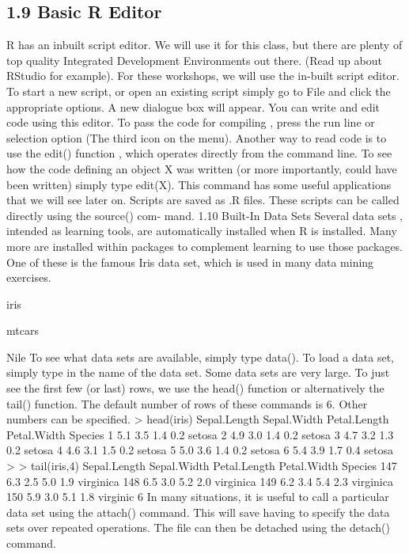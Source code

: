 
\subsection{1.9 Basic R Editor}
R has an inbuilt script editor. We will use it for this class, but there are plenty of top quality
Integrated Development Environments out there. (Read up about RStudio for example).
For these workshops, we will use the in-built script editor.
To start a new script, or open an existing script simply go to File and click the appropriate
options. A new dialogue box will appear. You can write and edit code using this editor.
To pass the code for compiling , press the run line or selection option (The third icon
on the menu).
Another way to read code is to use the edit() function , which operates directly from the
command line. To see how the code defining an object X was written (or more importantly,
could have been written) simply type edit(X). This command has some useful applications
that we will see later on.
Scripts are saved as .R files. These scripts can be called directly using the source() com-
mand.
1.10 Built-In Data Sets
Several data sets , intended as learning tools, are automatically installed when R is installed.
Many more are installed within packages to complement learning to use those packages. One
of these is the famous Iris data set, which is used in many data mining exercises.
\item iris
\item mtcars
\item Nile
To see what data sets are available, simply type data(). To load a data set, simply type in the
name of the data set. Some data sets are very large. To just see the first few (or last) rows, we
use the head() function or alternatively the tail() function. The default number of rows of
these commands is 6. Other numbers can be specified.
> head(iris)
Sepal.Length Sepal.Width Petal.Length Petal.Width Species
1 5.1 3.5 1.4 0.2 setosa
2 4.9 3.0 1.4 0.2 setosa
3 4.7 3.2 1.3 0.2 setosa
4 4.6 3.1 1.5 0.2 setosa
5 5.0 3.6 1.4 0.2 setosa
6 5.4 3.9 1.7 0.4 setosa
>
> tail(iris,4)
Sepal.Length Sepal.Width Petal.Length Petal.Width Species
147 6.3 2.5 5.0 1.9 virginica
148 6.5 3.0 5.2 2.0 virginica
149 6.2 3.4 5.4 2.3 virginica
150 5.9 3.0 5.1 1.8 virginic
6
In many situations, it is useful to call a particular data set using the attach() command. This
will save having to specify the data sets over repeated operations. The file can then be detached
using the detach() command.

